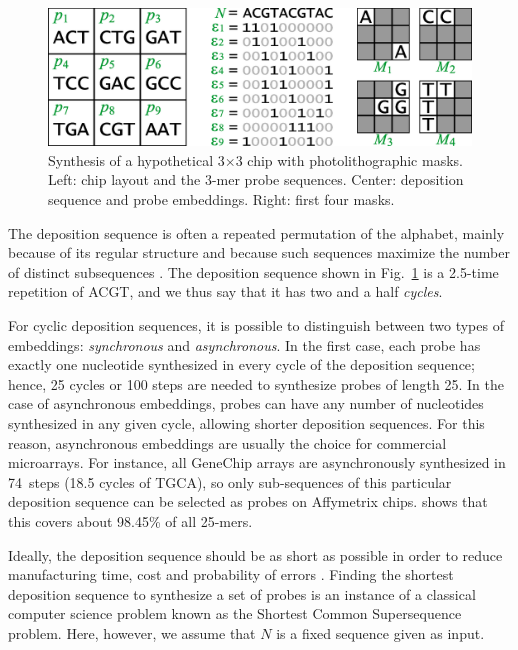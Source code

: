\documentclass{w-edbk}
\begin{document}
\begin{figure}
\centerline{\includegraphics[width=\textwidth]{figures/chip.eps}}
\caption{Synthesis of a hypothetical 3$\times$3 chip with photolithographic
masks. Left: chip layout and the 3-mer probe sequences. Center: deposition
sequence and probe embeddings. Right: first four masks.}
\label{fig:masking_process}
\end{figure}

The deposition sequence is often a repeated permutation of the alphabet, mainly
because of its regular structure and because such sequences maximize the number
of distinct subsequences \citep{Chase1976}. The deposition sequence shown in
Fig.~\ref{fig:masking_process} is a 2.5-time repetition of ACGT, and we thus
say that it has two and a half \emph{cycles}.

For cyclic deposition sequences, it is possible to distinguish between two
types of embeddings: \emph{synchronous} and \emph{asynchronous}. In the first
case, each probe has exactly one nucleotide synthesized in every cycle of the
deposition sequence; hence, 25 cycles or 100 steps are needed to synthesize
probes of length 25. In the case of asynchronous embeddings, probes can have
any number of nucleotides synthesized in any given cycle, allowing shorter
deposition sequences. For this reason, asynchronous embeddings are usually the
choice for commercial microarrays.  For instance, all GeneChip arrays are
asynchronously synthesized in 74~steps (18.5 cycles of TGCA), so only
sub-sequences of this particular deposition sequence can be selected as probes
on Affymetrix chips.  \citet{Rahmann2006SubsequenceCombinatorics} shows that
this covers about 98.45\% of all 25-mers.

Ideally, the deposition sequence should be as short as possible in order to
reduce manufacturing time, cost and probability of errors \citep{Rahmann2003}.
Finding the shortest deposition sequence to synthesize a set of probes is an
instance of a classical computer science problem known as the Shortest Common
Supersequence problem. Here, however, we assume that $N$ is a fixed sequence
given as input.
\end{document}
